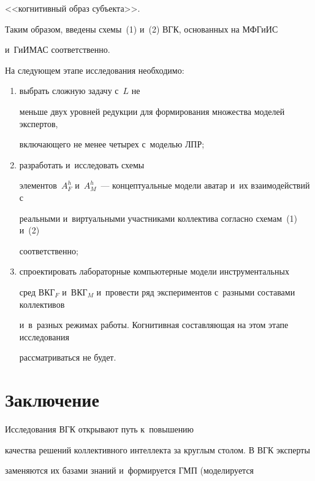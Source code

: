<<когнитивный образ субъекта>>.





  Таким образом, введены схемы~(1) и~(2) ВГК, основанных на МФГиИС 


  и~ГиИМАС соответственно.


  


  На следующем этапе исследования необходимо: 


\begin{enumerate}[(1)]


\item выбрать сложную задачу с~$L$ не 


меньше двух уровней редукции для формирования множества моделей экспертов, 


включающего не менее четырех с~моделью ЛПР; 


\item разработать и~исследовать схемы 


элементов~$A_F^h$ и~$A_M^h$~--- концептуальные модели аватар и~их взаимодействий с~


реальными и~виртуальными участниками коллектива согласно схемам~(1) и~(2) 


соответственно; 


\item спроектировать лабораторные компьютерные модели инструментальных 


сред ВКГ$_F$ и~ВКГ$_M$ и~провести ряд экспериментов с~разными составами коллективов 


и~в~разных режимах работы. Когнитивная составляющая на этом этапе исследования 


рассматриваться не будет.


\end{enumerate}





\section{Заключение}





  Исследования ВГК открывают путь к~повышению 


качества решений коллективного интеллекта за круглым столом. В ВГК эксперты 


заменяются их базами знаний и~формируется ГМП (моделируется 


